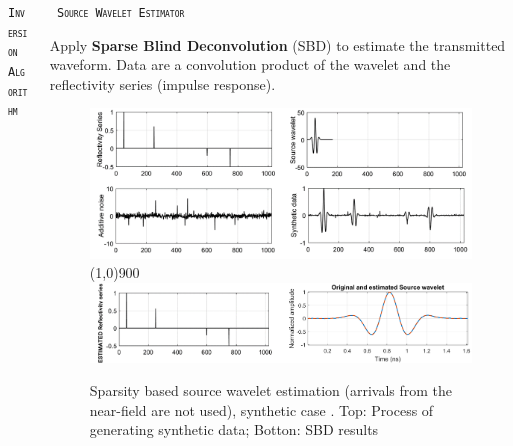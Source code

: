 \documentclass[final]{beamer}
\newlength{\onecolwid}
\newlength{\twocolwid}
\begin{document}
\begin{frame}[t]
\begin{columns}[t]
\begin{column}{\twocolwid}
\begin{columns}[t,totalwidth=\twocolwid]
\begin{column}{\onecolwid}
\begin{block}{\textsc{\texttt{Inversion Algorithm}}}
\end{block}


\end{column} %

\begin{column}{\onecolwid}\vspace{-.6in} %


\begin{block}{\textsc{\texttt{ Source Wavelet Estimator}}}
	
Apply \textbf{Sparse Blind Deconvolution} (SBD) to estimate the transmitted waveform. Data are a convolution product of the wavelet and the reflectivity series (impulse response).

	\begin{figure}
		\includegraphics[width=1\linewidth]{synthtic_model_SBD.png}
		\vspace{-3mm}
		\line(1,0){900}
		\vspace{1cm}
		\includegraphics[width=0.98\linewidth]{SBD_synthetic_refl.png}
		\caption{Sparsity based source wavelet estimation (arrivals from the near-field are not used), synthetic case \cite{jazayeri2017sparse}.
		Top: Process of generating synthetic data; Botton: SBD results}
	\end{figure}
	

\end{block}
\end{column}
\end{columns}
\end{column}
\end{columns}
\end{frame}
\end{document}
